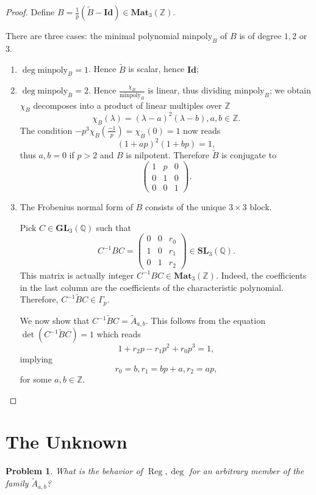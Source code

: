 \documentclass[a4paper]{article}
\newtheorem{Prob}[Thm]{Problem}
\newcommand{\Id}{\mathbf{Id}}        %
\newcommand{\GL}{\mathbf{GL}_3} %
\newcommand{\MatZ}{\mathbf{Mat}_3(\mathbb{Z})}        %
\newcommand{\SLp}{\Gamma_p}        %
\newcommand{\minpoly}{\mathrm{minpoly}}        %
\DeclareMathOperator{\Reg}{Reg}        %
\begin{document}
\begin{proof}
Define $B = \frac{1}{p}(\tilde B - \Id) \in \MatZ$.

There are three cases:
the minimal polynomial $\minpoly_B$ of $B$ is of degree $1, 2$ or $3$.
\begin{enumerate}
	\item $\deg \minpoly_B = 1$.  Hence $\tilde B$ is scalar, hence $\Id$;
	\item $\deg \minpoly_B = 2$.  Hence $ \frac{\chi_B}{\minpoly_B}$ is linear, thus dividing $\minpoly_B$; we obtain $\chi_B$ decomposes into a product of linear multiples over $ \mathbb{Z}$
	$$
	\chi_{B} (\lambda) = (\lambda - a)^2 (\lambda - b), a, b \in \mathbb{Z}.
	$$
	The condition $ - p^3 \chi_{B}( \frac{-1}{p}) = \chi_{\tilde B}(0) = 1$ now reads
	\[
	(1 + a p)^2 (1 + b p ) = 1
	,\] 
	thus $a, b = 0$ if $p > 2$ and $B$ is nilpotent.
	Therefore $\tilde B$ is conjugate to 
	\[
	\begin{pmatrix}
	1 & p & 0 \\
	0 & 1 & 0 \\
	0 & 0 & 1
	\end{pmatrix}
	.\] 
	\item
	The Frobenius normal form of 
	$B$ 
	consists of the unique $3 \times 3$ block.  

	Pick $C \in \GL( \mathbb{Q} ) $ such that 
	$$
	C^{-1} B C =
	\begin{pmatrix}
	0 & 0 & r_0 \\
	1 & 0 & r_1 \\
	0 & 1 & r_2
	\end{pmatrix} \in 
	\mathbf{SL}_3(\mathbb{Q})
	.$$ 
	This matrix is actually integer $ C^{-1} B C \in \MatZ$.
	Indeed, the coefficients in the last column are the coefficients of the characteristic polynomial. 
	Therefore, $ C^{-1} \tilde B C \in \SLp $.

	We now show that 
	$ C^{-1} \tilde B C = \tilde A_{a, b}$.
	This follows from the equation $\det (C^{-1} \tilde B C) = 1$ which reads
	\[
	1 + r_2 p - r_1 p^2 + r_0 p^3 = 1
	,\] 
	implying
	 \[
	r_0 = b, r_1 = bp + a, r_2 = ap,
	\] 
	for some $a, b \in \mathbb{Z}$.
\end{enumerate}


\end{proof}

\section{The Unknown}
\begin{Prob}
What is the behavior of $\Reg, \deg $ for an arbitrary member of the family $\tilde A_{a, b}$?
\end{Prob}


















\end{document}
